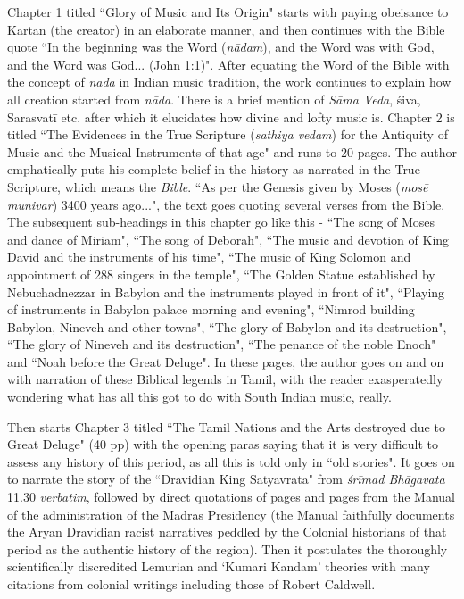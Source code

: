 Chapter 1 titled ``Glory of Music and Its Origin" starts with paying obeisance to Kartan (the creator) in an elaborate manner, and then continues with the Bible quote ``In the beginning was the Word (\textit{nādam}), and the Word was with God, and the Word was God... (John 1:1)". After equating the Word of the Bible with the concept of \textit{nāda} in Indian music tradition, the work continues to explain how all creation started from \textit{nāda}. There is a brief mention of \textit{Sāma Veda}, śiva, Sarasvatī etc. after which it elucidates how divine and lofty music is. Chapter 2 is titled ``The Evidences in the True Scripture (\textit{sathiya vedam}) for the Antiquity of Music and the Musical Instruments of that age" and runs to 20 pages. The author emphatically puts his complete belief in the history as narrated in the True Scripture, which means the \textit{Bible}. ``As per the Genesis given by Moses (\textit{mosē munivar}) 3400 years ago...", the text goes quoting several verses from the Bible. The subsequent sub-headings in this chapter go like this - ``The song of Moses and dance of Miriam", ``The song of Deborah", ``The music and devotion of King David and the instruments of his time", ``The music of King Solomon and appointment of 288 singers in the temple", ``The Golden Statue established by Nebuchadnezzar in Babylon and the instruments played in front of it", ``Playing of instruments in Babylon palace morning and evening", ``Nimrod building Babylon, Nineveh and other towns", ``The glory of Babylon and its destruction", ``The glory of Nineveh and its destruction", ``The penance of the noble Enoch" and ``Noah before the Great Deluge". In these pages, the author goes on and on with narration of these Biblical legends in Tamil, with the reader exasperatedly wondering what has all this got to do with South Indian music, really.


Then starts Chapter 3 titled ``The Tamil Nations and the Arts destroyed due to Great Deluge" (40 pp) with the opening paras saying that it is very difficult to assess any history of this period, as all this is told only in ``old stories". It goes on to narrate the story of the ``Dravidian King Satyavrata" from \textit{śrīmad Bhāgavata} 11.30 \textit{verbatim}, followed by direct quotations of pages and pages from the Manual of the administration of the Madras Presidency (the Manual faithfully documents the Aryan Dravidian racist narratives peddled by the Colonial historians of that period as the authentic history of the region). Then it postulates the thoroughly scientifically discredited Lemurian and `Kumari Kandam' theories with many citations from colonial writings including those of Robert Caldwell.

